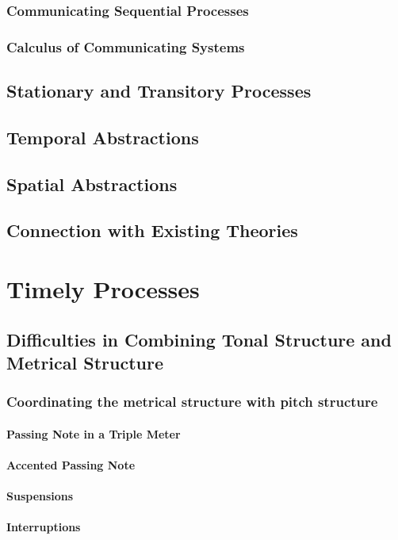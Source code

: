         \subsection{Communicating Sequential Processes}
        \subsection{Calculus of Communicating Systems}
    \section{Stationary and Transitory Processes}
    \section{Temporal Abstractions}
    \section{Spatial Abstractions}
    \section{Connection with Existing Theories}

\chapter{Timely Processes}
    \section{Difficulties in Combining Tonal Structure and Metrical Structure}
        \subsection{Coordinating the metrical structure with pitch structure}
            \subsubsection{Passing Note in a Triple Meter}
            \subsubsection{Accented Passing Note}
            \subsubsection{Suspensions}
            \subsubsection{Interruptions}
